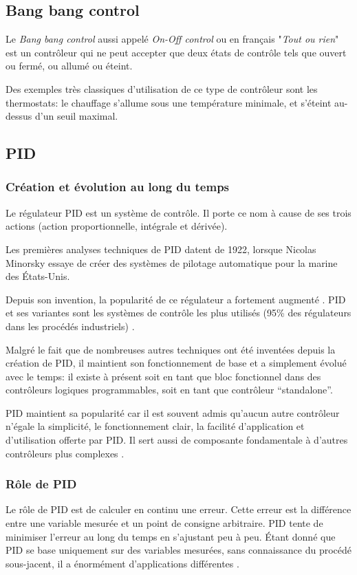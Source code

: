 \documentclass[a4paper,10pt]{report}
\begin{document}
\subsection{Bang bang control}
Le \emph{Bang bang control} aussi appelé \emph{On-Off control} ou en français "\emph{Tout ou rien}" est un contrôleur qui ne peut accepter que deux états de contrôle tels que ouvert ou fermé, ou allumé ou éteint.

Des exemples très classiques d'utilisation de ce type de contrôleur sont les thermostats: le chauffage s'allume sous une température minimale, et s'éteint au-dessus d'un seuil maximal.


\subsection{PID}
\subsubsection{Création et évolution au long du temps}

Le régulateur PID est un système de contrôle.
Il porte ce nom à cause de ses trois actions (action proportionnelle, intégrale et dérivée).

Les premières analyses techniques de PID datent de 1922, lorsque Nicolas Minorsky essaye de créer des systèmes de pilotage automatique pour la marine des États-Unis. \cite{minorsky1922directional}

Depuis son invention, la popularité de ce régulateur a fortement augmenté \cite{ang2005pid}.
PID et ses variantes sont les systèmes de contrôle les plus utilisés (95\% des régulateurs dans les procédés industriels) \cite{Kinnaert2013} \cite{Astrom2002}.

Malgré le fait que de nombreuses autres techniques ont été inventées depuis la création de PID, il maintient son fonctionnement de base et a simplement évolué avec le temps:
il existe à présent soit en tant que bloc fonctionnel dans des contrôleurs logiques programmables, soit en tant que contrôleur ``standalone''.

PID maintient sa popularité car il est souvent admis qu'aucun autre contrôleur n'égale la simplicité, le fonctionnement clair, la facilité d'application et d'utilisation offerte par PID.
Il sert aussi de composante fondamentale à d'autres contrôleurs plus complexes \cite{ang2005pid} \cite{visioli2006practical}.

\subsubsection{Rôle de PID}
Le rôle de PID est de calculer en continu une erreur.
Cette erreur est la différence entre une variable mesurée et un point de consigne arbitraire.
PID tente de minimiser l'erreur au long du temps en s'ajustant peu à peu.
Étant donné que PID se base uniquement sur des variables mesurées, sans connaissance du procédé sous-jacent, il a énormément d'applications différentes \cite{bennett1993history}.
\end{document}
